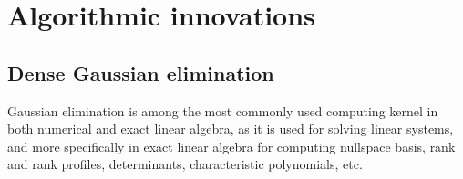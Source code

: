\documentclass{deliverablereport}
\author{Cl\'ement Pernet and Jean-Guillaume Dumas}
\begin{document}
\maketitle
\githubissuedescription

\section{Algorithmic innovations}

\subsection{Dense Gaussian elimination}

Gaussian elimination is among the most commonly used computing kernel in both
numerical and exact linear algebra, as it is used for solving linear systems,
and more specifically in exact linear algebra for computing nullspace basis,
rank and rank profiles, determinants, characteristic polynomials, etc.
\end{document}
